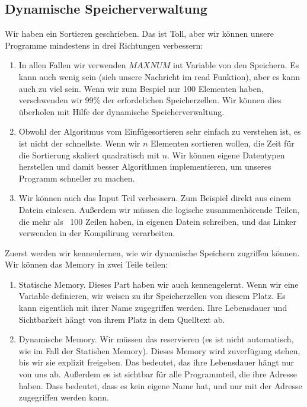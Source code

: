 \documentclass{article}[12pt]
\begin{document}
\subsection{Dynamische Speicherverwaltung}
Wir haben ein Sortieren geschrieben. Das ist Toll, aber wir können unsere Programme mindestens in drei Richtungen
verbessern:
\begin{enumerate}
\item In allen Fallen wir verwenden $MAXNUM$ int Variable von den Speichern. Es kann auch wenig sein (sieh unsere
Nachricht im read Funktion), aber es kann auch zu viel sein. Wenn wir zum Bespiel nur 100 Elementen haben, verschwenden
wir 99\% der erfordelichen Speicherzellen. Wir können dies überholen mit Hilfe der dynamische Speicherverwaltung.
\item
Obwohl der Algoritmus vom Einfügesortieren sehr einfach zu verstehen ist, es ist nicht der schnellste. Wenn wir 
$n$ Elementen sortieren wollen, die Zeit für die Sortierung skaliert quadratisch mit $n$. Wir können 
eigene Datentypen herstellen und damit besser Algorithmen implementieren, um unseres Programm schneller zu machen.
\item
Wir können auch das Input Teil verbessern. Zum Beispiel direkt aus einem Datein einlesen. Außerdem wir müssen
die logische zusammenhörende Teilen, die mehr als ~100 Zeilen haben, in eigenen Datein schreiben, und das Linker
verwenden in der Kompilirung verarbeiten.
\end{enumerate}
Zuerst werden wir kennenlernen, wie wir dynamische Speichern zugriffen können. Wir können das Memory in zwei Teile teilen:
\begin{enumerate}
\item Statische Memory. Dieses Part haben wir auch kennengelernt. Wenn wir eine Variable definieren, wir weisen zu ihr
Speicherzellen von diesem Platz. Es kann eigentlich mit ihrer Name zugegriffen werden. Ihre Lebensdauer und Sichtbarkeit 
hängt von ihrem Platz in dem Quelltext ab.
\item Dynamische Memory. Wir müssen das reservieren (es ist nicht automatisch, wie im Fall der Statishen Memory).
Dieses Memory wird zuverfügung stehen, bis wir sie explizit freigeben. Das bedeutet, das ihre Lebensdauer 
hängt nur von uns ab. Außerdem es ist sichtbar für alle Programmteil, die ihre Adresse haben. Dass
bedeutet, dass es kein eigene Name hat, und nur mit der Adresse zugegriffen werden kann.
\end{enumerate}
\end{document}
